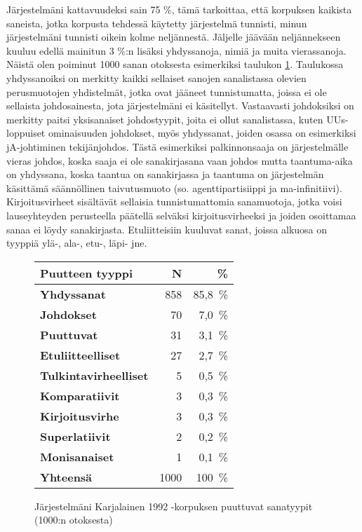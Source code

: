 \documentclass[free]{flammie}
\begin{document}
Järjestelmäni kattavuudeksi sain 75 \%, tämä tarkoittaa, että korpuksen kaikista
saneista, jotka korpusta tehdessä käytetty järjestelmä tunnisti, minun järjestelmäni tunnisti oikein kolme neljännestä. Jäljelle jäävään neljännekseen kuuluu edellä
mainitun 3 \%:n lisäksi yhdyssanoja, nimiä ja muita vierassanoja. Näistä olen
poiminut 1000 sanan otoksesta esimerkiksi taulukon \ref{table:10}. Taulukossa yhdyssanoiksi
on merkitty kaikki sellaiset sanojen sanalistassa olevien perusmuotojen yhdistelmät, jotka ovat jääneet tunnistumatta, joissa ei ole sellaista johdosainesta, jota
järjestelmäni ei käsitellyt. Vastaavasti johdoksiksi on merkitty paitsi yksisanaiset
johdostyypit, joita ei ollut sanalistassa, kuten UUs-loppuiset ominaisuuden johdokset, myös yhdyssanat, joiden osassa on esimerkiksi jA-johtiminen tekijänjohdos. Tästä esimerkiksi palkinnonsaaja on järjestelmälle vieras johdos, koska saaja
ei ole sanakirjasana vaan johdos mutta taantuma-aika on yhdyssana, koska taantua on sanakirjassa ja taantuma on järjestelmän käsittämä säännöllinen taivutusmuoto (so. agenttipartisiippi ja ma-infinitiivi). Kirjoitusvirheet sisältävät sellaisia
tunnistumattomia sanamuotoja, jotka voisi lauseyhteyden perusteella päätellä selväksi kirjoitusvirheeksi ja joiden osoittamaa sanaa ei löydy sanakirjasta. Etuliitteisiin kuuluvat sanat, joissa alkuosa on tyyppiä ylä-, ala-, etu-, läpi- jne.

\begin{figure}
    \caption{Järjestelmäni Karjalainen 1992 -korpuksen puuttuvat sanatyypit (1000:n
    otoksesta) \label{table:10}}
    \begin{tabular}{l|r|r}
    \hline
        \bf Puutteen tyyppi & N & \% \\
\hline
\hline
\bf Yhdyssanat & 858 & 85,8~\% \\
\hline
        \bf Johdokset & 70 & 7,0~\% \\
\hline
        \bf Puuttuvat & 31 & 3,1~\% \\
\hline
\bf Etuliitteelliset & 27 & 2,7~\% \\
\hline
\bf Tulkintavirheelliset & 5 & 0,5~\% \\
\hline
\bf Komparatiivit & 3 & 0,3~\% \\
\hline
\bf Kirjoitusvirhe & 3 & 0,3~\% \\
\hline
\bf Superlatiivit & 2 & 0,2~\% \\
\hline
\bf Monisanaiset & 1 & 0,1~\% \\
\hline
\hline
\bf Yhteensä & 1000 & 100~\% \\
\hline
    \end{tabular}
\end{figure}
\end{document}
